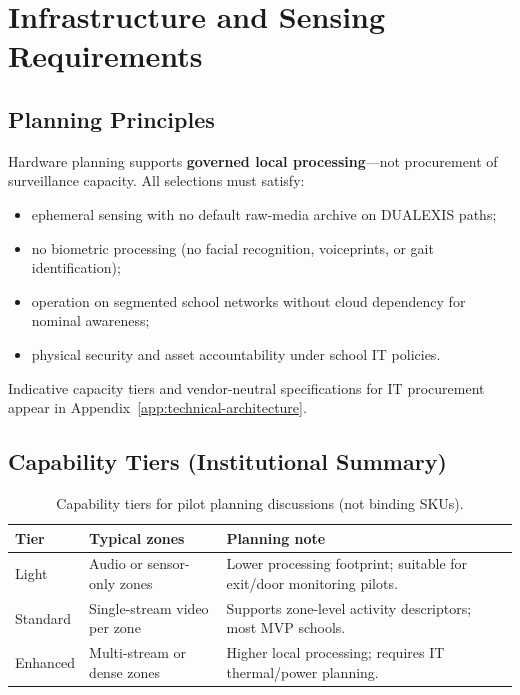 \section{Infrastructure and Sensing Requirements}
\label{sec:hardware-requirements}

\subsection{Planning Principles}

Hardware planning supports \textbf{governed local processing}---not procurement of
surveillance capacity.
All selections must satisfy:

\begin{itemize}[noitemsep]
  \item ephemeral sensing with no default raw-media archive on DUALEXIS paths;
  \item no biometric processing (no facial recognition, voiceprints, or gait identification);
  \item operation on segmented school networks without cloud dependency for nominal awareness;
  \item physical security and asset accountability under school IT policies.
\end{itemize}

Indicative capacity tiers and vendor-neutral specifications for IT procurement appear in
Appendix~\ref{app:technical-architecture}.

\subsection{Capability Tiers (Institutional Summary)}

\begin{table}[htbp]
  \centering
  \caption{Capability tiers for pilot planning discussions (not binding SKUs).}
  \label{tab:capability-tiers}
  \small
  \begin{tabular}{@{}p{3.2cm}p{5.0cm}p{4.8cm}@{}}
    \toprule
    Tier & Typical zones & Planning note \\
    \midrule
    Light &
      Audio or sensor-only zones &
      Lower processing footprint; suitable for exit/door monitoring pilots. \\
    Standard &
      Single-stream video per zone &
      Supports zone-level activity descriptors; most MVP schools. \\
    Enhanced &
      Multi-stream or dense zones &
      Higher local processing; requires IT thermal/power planning. \\
    \bottomrule
  \end{tabular}
\end{table}

